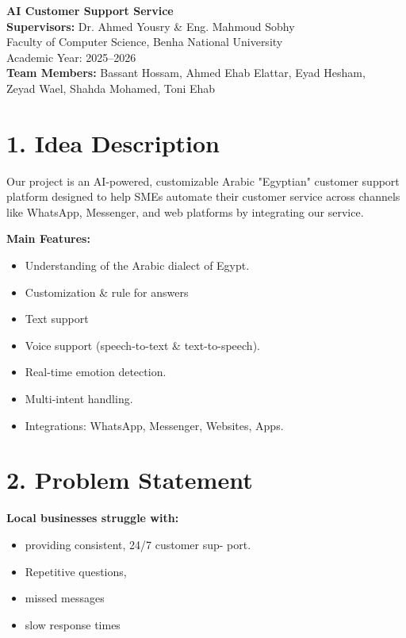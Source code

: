 \documentclass[12pt,a4paper]{article}
\begin{document}
\begin{center}
    {\Huge \textbf{AI Customer Support Service}}\\[0.8cm]

    {\large \textbf{Supervisors:} Dr. Ahmed Yousry \& Eng. Mahmoud Sobhy}\\[0.3cm]

    {\large Faculty of Computer Science, Benha National University}\\[0.3cm]
    {\large Academic Year: 2025–2026}\\[0.3cm]

    {\small \textbf{Team Members:} Bassant Hossam, Ahmed Ehab Elattar, Eyad Hesham,\\ 
    Zeyad Wael, Shahda Mohamed, Toni Ehab}\\[0.8cm]
\end{center}

\section*{1. Idea Description}
Our project is an AI-powered, customizable Arabic "Egyptian" customer support platform designed to help SMEs automate their customer service across channels like WhatsApp, Messenger, and web platforms by integrating our service.

\textbf{Main Features:}
\begin{itemize}[noitemsep]
    \item Understanding of the Arabic dialect of Egypt.
    \item Customization \& rule for answers
    \item Text support
    \item Voice support (speech-to-text \& text-to-speech).
    \item Real-time emotion detection.
    \item Multi-intent handling.
    \item Integrations: WhatsApp, Messenger, Websites, Apps.
\end{itemize}
\section*{2. Problem Statement}
\textbf{Local businesses struggle with:}
\begin{itemize}[noitemsep]
    \item providing consistent, 24/7 customer sup-
port.
    \item Repetitive questions,
    \item missed messages
    \item slow response times
\end{itemize}
    
\end{document}
